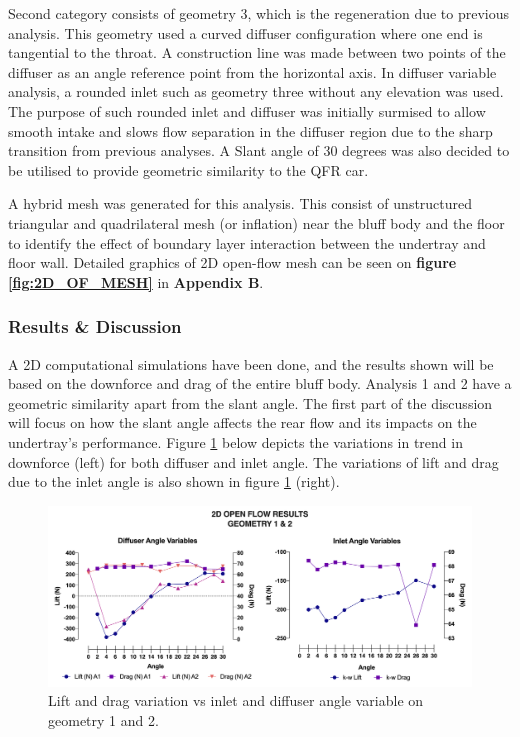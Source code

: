 \noindent Second category consists of geometry 3, which is the regeneration due to previous analysis. This geometry used a curved diffuser configuration where one end is tangential to the throat. A construction line was made between two points of the diffuser as an angle reference point from the horizontal axis. In diffuser variable analysis, a rounded inlet such as geometry three without any elevation was used. The purpose of such rounded inlet and diffuser was initially surmised to allow smooth intake and slows flow separation in the diffuser region due to the sharp transition from previous analyses. A Slant angle of 30 degrees was also decided to be utilised to provide geometric similarity to the QFR car.

\noindent A hybrid mesh was generated for this analysis. This consist of unstructured triangular and quadrilateral mesh (or inflation) near the bluff body and the floor to identify the effect of boundary layer interaction between the undertray and floor wall.  Detailed graphics of 2D open-flow mesh can be seen on \textbf{figure \ref{fig:2D_OF_MESH}} in \textbf{Appendix B}.

\subsubsection{Results \& Discussion}

\noindent A 2D computational simulations have been done, and the results shown will be based on the downforce and drag of the entire bluff body. Analysis 1 and 2 have a geometric similarity apart from the slant angle. The first part of the discussion will focus on how the slant angle affects the rear flow and its impacts on the undertray's performance. Figure \ref{fig:2D_OF_A12_results} below depicts the variations in trend in downforce (left) for both diffuser and inlet angle. The variations of lift and drag due to the inlet angle is also shown in figure \ref{fig:2D_OF_A12_results} (right).

\begin{figure}[!ht]
    \centering
    \includegraphics[scale = 0.6]{Figures/Graph/2D_OF_A1-2.png}
    \caption{Lift and drag variation vs inlet and diffuser angle variable on geometry 1 and 2. }
    \label{fig:2D_OF_A12_results}
\end{figure}

